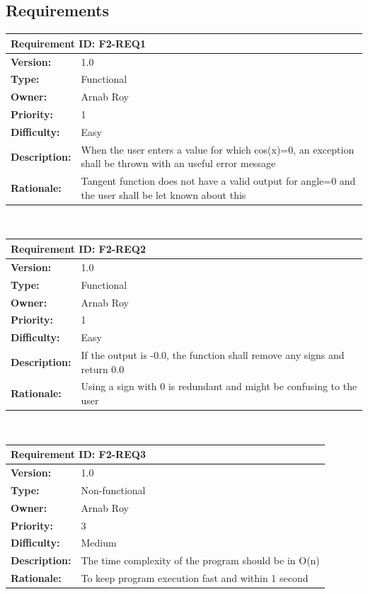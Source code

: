 \documentclass[paper=a4, fontsize=11pt,twoside]{scrartcl}	%
\begin{document}
    \subsection{Requirements}
    \begin{tabular}{ |p{4cm} | p{10cm}| }
     \hline
     \multicolumn{2}{|l|}{\textbf{Requirement ID: F2-REQ1}} \\
     \hline
     \textbf{Version:} & 1.0\\
     \textbf{Type:} & Functional\\
     \textbf{Owner:} & Arnab Roy\\
     \textbf{Priority:} & 1\\
     \textbf{Difficulty:} & Easy\\
     \textbf{Description:} & When the user enters a value for which cos(x)=0, an exception shall be thrown with an useful error message \\
     \textbf{Rationale:} & Tangent function does not have a valid output for angle=0 and the user shall be let known about this\\
     \hline
    \end{tabular}
    \\[10pt]
    \begin{tabular}{ |p{4cm} | p{10cm}| }
     \hline
     \multicolumn{2}{|l|}{\textbf{Requirement ID: F2-REQ2}} \\
     \hline
     \textbf{Version:} & 1.0\\
     \textbf{Type:} & Functional\\
     \textbf{Owner:} & Arnab Roy\\
     \textbf{Priority:} & 1\\
     \textbf{Difficulty:} & Easy\\
     \textbf{Description:} & If the output is -0.0, the function shall remove any signs and return 0.0 \\
     \textbf{Rationale:} & Using a sign with 0 is redundant and might be confusing to the user\\
     \hline
    \end{tabular}
    \\[10pt]
    \begin{tabular}{ |p{4cm} | p{10cm}| }
     \hline
     \multicolumn{2}{|l|}{\textbf{Requirement ID: F2-REQ3}} \\
     \hline
     \textbf{Version:} & 1.0\\
     \textbf{Type:} & Non-functional\\
     \textbf{Owner:} & Arnab Roy\\
     \textbf{Priority:} & 3\\
     \textbf{Difficulty:} & Medium\\
     \textbf{Description:} & The time complexity of the program should be in O(n) \\
     \textbf{Rationale:} & To keep program execution fast and within 1 second\\
     \hline
    \end{tabular}
\end{document}
